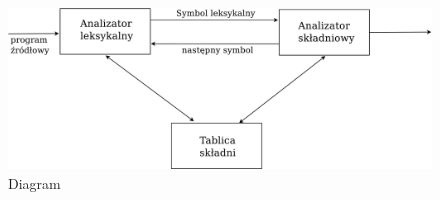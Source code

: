 \documentclass[a4paper,12pt,twoside]{article}
\begin{document}
\begin{figure}
\centerline{\includegraphics[scale=0.2]{Diagram1}}
\caption{Diagram}
\end{figure}
\end{document}
